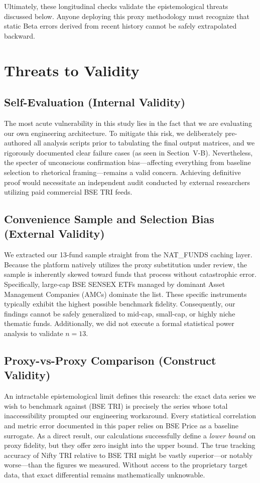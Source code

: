 \documentclass[conference]{IEEEtran}
\begin{document}
Ultimately, these longitudinal checks validate the epistemological threats discussed below. Anyone deploying this proxy methodology must recognize that static Beta errors derived from recent history cannot be safely extrapolated backward.

\section{Threats to Validity}
\label{sec:threats}
\subsection{Self-Evaluation (Internal Validity)}
The most acute vulnerability in this study lies in the fact that we are evaluating our own engineering architecture. To mitigate this risk, we deliberately pre-authored all analysis scripts prior to tabulating the final output matrices, and we rigorously documented clear failure cases (as seen in Section~V-B). Nevertheless, the specter of unconscious confirmation bias---affecting everything from baseline selection to rhetorical framing---remains a valid concern. Achieving definitive proof would necessitate an independent audit conducted by external researchers utilizing paid commercial BSE TRI feeds.

\subsection{Convenience Sample and Selection Bias (External Validity)}
We extracted our 13-fund sample straight from the NAT\_FUNDS caching layer. Because the platform natively utilizes the proxy substitution under review, the sample is inherently skewed toward funds that process without catastrophic error. Specifically, large-cap BSE SENSEX ETFs managed by dominant Asset Management Companies (AMCs) dominate the list. These specific instruments typically exhibit the highest possible benchmark fidelity. Consequently, our findings cannot be safely generalized to mid-cap, small-cap, or highly niche thematic funds. Additionally, we did not execute a formal statistical power analysis to validate $n=13$.

\subsection{Proxy-vs-Proxy Comparison (Construct Validity)}
An intractable epistemological limit defines this research: the exact data series we wish to benchmark against (BSE TRI) is precisely the series whose total inaccessibility prompted our engineering workaround. Every statistical correlation and metric error documented in this paper relies on BSE Price as a baseline surrogate. As a direct result, our calculations successfully define a \emph{lower bound} on proxy fidelity, but they offer zero insight into the upper bound. The true tracking accuracy of Nifty TRI relative to BSE TRI might be vastly superior---or notably worse---than the figures we measured. Without access to the proprietary target data, that exact differential remains mathematically unknowable.
\end{document}

